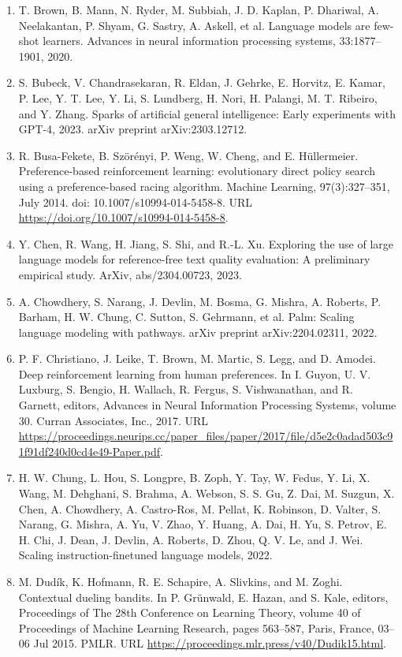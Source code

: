 \documentclass[11pt,UTF8,fontset=fandol]{ctexart}
\begin{document}
\begin{enumerate}[leftmargin=2.2em, itemsep=2pt]
\item T. Brown, B. Mann, N. Ryder, M. Subbiah, J. D. Kaplan, P. Dhariwal, A. Neelakantan, P. Shyam, G. Sastry, A. Askell, et al. Language models are few-shot learners. Advances in neural information processing systems, 33:1877--1901, 2020.
\item S. Bubeck, V. Chandrasekaran, R. Eldan, J. Gehrke, E. Horvitz, E. Kamar, P. Lee, Y. T. Lee, Y. Li, S. Lundberg, H. Nori, H. Palangi, M. T. Ribeiro, and Y. Zhang. Sparks of artificial general intelligence: Early experiments with GPT-4, 2023. arXiv preprint arXiv:2303.12712.
\item R. Busa-Fekete, B. Sz\"or\'enyi, P. Weng, W. Cheng, and E. H\"ullermeier. Preference-based reinforcement learning: evolutionary direct policy search using a preference-based racing algorithm. Machine Learning, 97(3):327--351, July 2014. doi: 10.1007/s10994-014-5458-8. URL \url{https://doi.org/10.1007/s10994-014-5458-8}.
\item Y. Chen, R. Wang, H. Jiang, S. Shi, and R.-L. Xu. Exploring the use of large language models for reference-free text quality evaluation: A preliminary empirical study. ArXiv, abs/2304.00723, 2023.
\item A. Chowdhery, S. Narang, J. Devlin, M. Bosma, G. Mishra, A. Roberts, P. Barham, H. W. Chung, C. Sutton, S. Gehrmann, et al. Palm: Scaling language modeling with pathways. arXiv preprint arXiv:2204.02311, 2022.
\item P. F. Christiano, J. Leike, T. Brown, M. Martic, S. Legg, and D. Amodei. Deep reinforcement learning from human preferences. In I. Guyon, U. V. Luxburg, S. Bengio, H. Wallach, R. Fergus, S. Vishwanathan, and R. Garnett, editors, Advances in Neural Information Processing Systems, volume 30. Curran Associates, Inc., 2017. URL \url{https://proceedings.neurips.cc/paper_files/paper/2017/file/d5e2c0adad503c91f91df240d0cd4e49-Paper.pdf}.
\item H. W. Chung, L. Hou, S. Longpre, B. Zoph, Y. Tay, W. Fedus, Y. Li, X. Wang, M. Dehghani, S. Brahma, A. Webson, S. S. Gu, Z. Dai, M. Suzgun, X. Chen, A. Chowdhery, A. Castro-Ros, M. Pellat, K. Robinson, D. Valter, S. Narang, G. Mishra, A. Yu, V. Zhao, Y. Huang, A. Dai, H. Yu, S. Petrov, E. H. Chi, J. Dean, J. Devlin, A. Roberts, D. Zhou, Q. V. Le, and J. Wei. Scaling instruction-finetuned language models, 2022.
\item M. Dud\'ik, K. Hofmann, R. E. Schapire, A. Slivkins, and M. Zoghi. Contextual dueling bandits. In P. Gr\"unwald, E. Hazan, and S. Kale, editors, Proceedings of The 28th Conference on Learning Theory, volume 40 of Proceedings of Machine Learning Research, pages 563--587, Paris, France, 03--06 Jul 2015. PMLR. URL \url{https://proceedings.mlr.press/v40/Dudik15.html}.

\end{enumerate}
\end{document}

